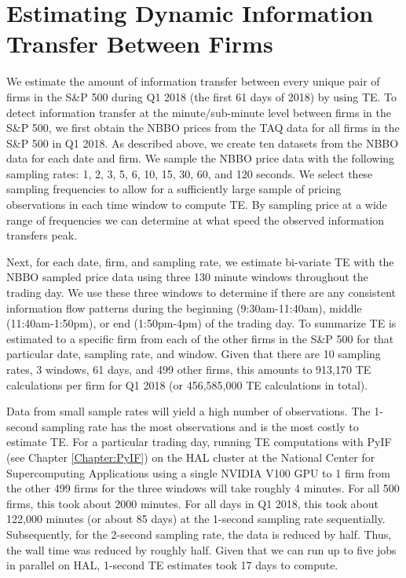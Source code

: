 \section{Estimating Dynamic Information Transfer Between Firms}

We estimate the amount of information transfer between every unique pair of firms in the S\&P 500 during Q1 2018 (the first 61 days of 2018) by using TE.  To detect information transfer at the minute/sub-minute level between firms in the S\&P 500, we first obtain the NBBO prices from the TAQ data for all firms in the S\&P 500 in Q1 2018.  As described above,  we create ten datasets from the NBBO data for each date and firm.  We sample the NBBO price data with the following sampling rates: 1,  2,  3,  5,  6,  10,  15,  30,  60,  and 120 seconds. We select these sampling frequencies to allow for a sufficiently large sample of pricing observations in each time window to compute TE.  By sampling price at a wide range of frequencies we can determine at what speed the observed  information transfers peak.  

Next,  for each date,  firm, and sampling rate,  we estimate bi-variate TE  with the NBBO sampled price data using three 130 minute windows throughout the trading day. We use these three windows to determine if there are any consistent information flow patterns during the beginning (9:30am-11:40am), middle (11:40am-1:50pm), or end (1:50pm-4pm) of the trading day.  To summarize TE is estimated to a specific firm from each of the other firms in the S\&P 500 for that particular date,  sampling rate,  and window.  Given that there are 10 sampling rates,  3 windows,  61 days,  and 499 other firms, this amounts to 913,170 TE calculations per firm for Q1 2018 (or 456,585,000 TE calculations in total).  

Data from small sample rates will yield a high number of observations.  %
The 1-second sampling rate has the most observations and is the most costly to estimate TE.  For a particular trading day,   running TE computations with PyIF (see Chapter \ref{Chapter:PyIF}) on the HAL cluster at the National Center for Supercomputing Applications using a single NVIDIA V100 GPU to 1 firm from the other 499 firms for the three windows will take roughly 4 minutes.  For all 500 firms, this took about 2000 minutes.  For all days in Q1 2018, this took about 122,000 minutes (or about 85 days) at the 1-second sampling rate sequentially.  Subsequently, for the 2-second sampling rate, the data is reduced by half. Thus, the wall time was reduced by roughly half.   Given that we can run up to five jobs in parallel on HAL, 1-second TE estimates took 17 days to compute. 


